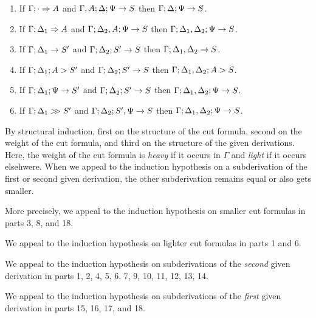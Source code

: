 \documentclass{sig-alt}
\begin{document}
\begin{Teorema}
\begin{enumerate}
\item If $\Gamma;\cdot\Rightarrow A$ and $\Gamma, A;\Delta;\Psi\rightarrow S$ then $\Gamma;\Delta;\Psi\rightarrow S$.
\item If $\Gamma;\Delta_1\Rightarrow A$ and $\Gamma;\Delta_2, A;\Psi\rightarrow S$ then $\Gamma;\Delta_1, \Delta_2;\Psi\rightarrow S$.
\\
\item If $\Gamma;\Delta_1\rightarrow S'$ and $\Gamma;\Delta_2;S'\rightarrow S$ then $\Gamma;\Delta_1,\Delta_2\rightarrow S$.
\item If $\Gamma;\Delta_1;A\mathrel>S'$ and $\Gamma;\Delta_2;S'\rightarrow S$ then $\Gamma;\Delta_1,\Delta_2;A\mathrel>S$.
\item If $\Gamma;\Delta_1;\Psi\rightarrow S'$ and $\Gamma;\Delta_2;S'\rightarrow S$ then $\Gamma;\Delta_1,\Delta_2;\Psi\rightarrow S$.
\item If $\Gamma;\Delta_1\mathrel{>\!\! >}S'$ and $\Gamma;\Delta_2;S',\Psi\rightarrow S$ then $\Gamma;\Delta_1,\Delta_2;\Psi\rightarrow S$.
\end{enumerate}
\end{Teorema}

\begin{Demo}
By structural induction, first on the structure of the cut formula,
second on the weight of the cut formula, and third on the structure of
the given derivations.  Here, the weight of the cut formula is
\emph{heavy} if it occurs in $\Gamma$ and \emph{light} if it occurs
elsehwere.  When we appeal to the induction hypothesis on a subderivation
of the first or second given derivation, the other subderivation remains
equal or also gets smaller.

More precisely, we appeal to the induction hypothesis
on smaller cut formulas in parts 3, 8, and 18.

We appeal to the induction hypothesis on lighter cut formulas
in parts 1 and 6.

We appeal to the induction hypothesis
on subderivations of the \emph{second} given derivation
in parts 1, 2, 4, 5, 6, 7, 9, 10, 11, 12, 13, 14.

We appeal to the induction hypothesis
on subderivations of the \emph{first} given derivation
in parts 15, 16, 17, and 18.


\end{Demo}
\end{document}
